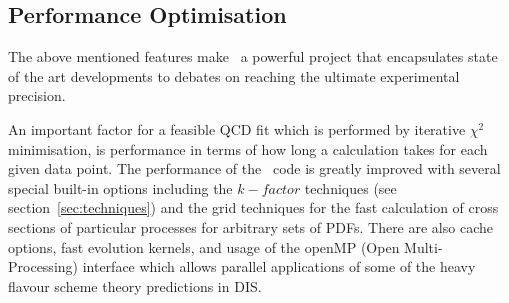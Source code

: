 \subsection{Performance Optimisation}

The above mentioned features make \fitter\ a powerful project that encapsulates 
state of the art developments 
to debates on reaching the ultimate experimental precision. 

An important factor for a feasible QCD fit which is performed by iterative 
$\chi^2$ minimisation, is performance in terms of how long a calculation takes for each given data point.
The performance of the \fitter\  code is greatly improved with several special built-in options
including the $k-factor$ techniques (see section~\ref{sec:techniques}) and the grid techniques for the fast calculation of cross 
sections of particular processes for arbitrary sets of PDFs. There are also cache options, fast evolution kernels, and 
usage of the openMP (Open Multi-Processing) interface which allows
parallel applications of some of the heavy flavour scheme theory predictions in DIS. 






